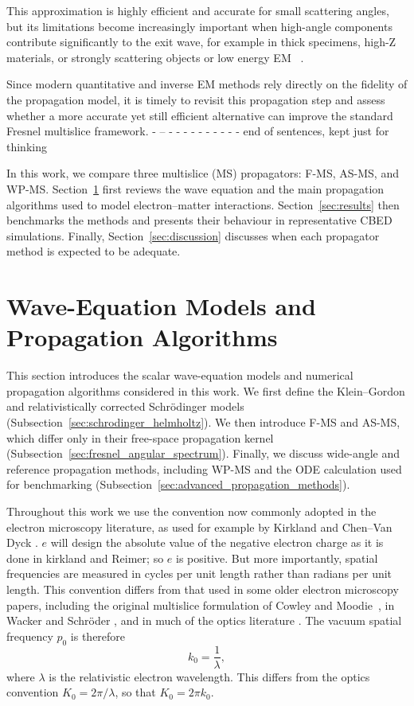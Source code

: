 \documentclass[preprint,12pt,number]{elsarticle}
\begin{document}
This approximation is highly efficient and accurate for small scattering angles, but its limitations become increasingly important when high-angle components contribute significantly to the exit wave, for example in thick specimens, high-Z materials, or strongly scattering objects or low energy EM ~\cite{RotherScheerschmidt2009,hillier_role_2017,WackerSchroeder2015,ming2013pcms}.  



Since modern quantitative and inverse EM methods rely directly on the fidelity of the propagation model, it is timely to revisit this propagation step and assess whether a more accurate yet still efficient alternative can improve the standard Fresnel multislice framework.
- -- - - - - - - - - - -  end of sentences, kept just for thinking 

In this work, we compare three multislice (MS) propagators: F-MS, AS-MS, and
WP-MS. Section~\ref{sec:algorithms_electron_matter} first reviews the wave
equation and the main propagation algorithms used to model electron--matter
interactions. Section~\ref{sec:results} then benchmarks the methods and
presents their behaviour in representative CBED simulations. Finally,
Section~\ref{sec:discussion} discusses when each propagator method is expected to be
adequate.

\section{Wave-Equation Models and Propagation Algorithms}
\label{sec:algorithms_electron_matter}

This section introduces the scalar wave-equation models and numerical
propagation algorithms considered in this work. We first define the
Klein--Gordon and relativistically corrected Schr\"odinger models
(Subsection~\ref{sec:schrodinger_helmholtz}). We then introduce F-MS and AS-MS,
which differ only in their free-space propagation kernel
(Subsection~\ref{sec:fresnel_angular_spectrum}). Finally, we discuss wide-angle
and reference propagation methods, including WP-MS and the ODE calculation used
for benchmarking (Subsection~\ref{sec:advanced_propagation_methods}).

Throughout this work we use the convention now commonly adopted in the electron
microscopy literature, as used for example by Kirkland and Chen--Van Dyck
\cite{kirkland2010advanced,ChenVanDyck1997}. $e$ will design the absolute value of the negative electron charge as it is done in kirkland and Reimer; so $e$ is positive. But more importantly, 
spatial frequencies are measured in cycles per unit length rather than radians
per unit length. This convention differs from that used in some older electron
microscopy papers, including the original multislice formulation of Cowley and
Moodie~\cite{cowley1957scattering}, in Wacker and Schr\"oder
\cite{WackerSchroeder2015}, and in much of the optics literature
\cite{goodman}. The vacuum spatial frequency  $p_0$  is therefore
\begin{equation}
k_0 = \frac{1}{\lambda},
\end{equation}
where $\lambda$ is the relativistic electron wavelength. This differs from the
optics convention $K_0=2\pi/\lambda$, so that $K_0=2\pi k_0$.  
\end{document}
